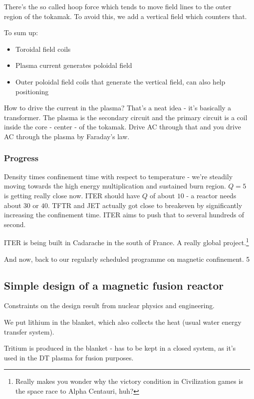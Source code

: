 \documentclass[PlasmaNotes.tex]{subfiles}
\begin{document}
There's the so called hoop force which tends to move field lines to the outer region of the tokamak. To avoid this, we add a vertical field which counters that.

To sum up:
\begin{itemize}
 \item Toroidal field coils
 \item Plasma current generates poloidal field
 \item Outer poloidal field coils that generate the vertical field, can also help positioning 
\end{itemize}

How to drive the current in the plasma? That's a neat idea - it's basically a transformer. The plasma is the secondary circuit and the primary circuit is a coil inside the core - center - of the tokamak. Drive AC through that and you drive AC through the plasma by Faraday's law.

\subsubsection{Progress}
Density times confinement time with respect to temperature - we're steadily moving towards the high energy multiplication and sustained burn region. $Q = 5$ is getting really close now. ITER should have $Q$ of about $10$ - a reactor needs about $30$ or $40$. TFTR and JET actually got close to breakeven by significantly increasing the confinement time. ITER aims to push that to several hundreds of second.

ITER is being built in Cadarache in the south of France. A really global project.\footnote{Really makes you wonder why the victory condition in Civilization games is the space race to Alpha Centauri, huh?}

And now, back to our regularly scheduled programme on magnetic confinement.
5

\subsection{Simple design of a magnetic fusion reactor}

Constraints on the design result from nuclear physics and engineering.

We put lithium in the blanket, which also collects the heat (usual water energy transfer system).

Tritium is produced in the blanket - has to be kept in a closed system, as it's used in the DT plasma for fusion purposes.
\end{document}
